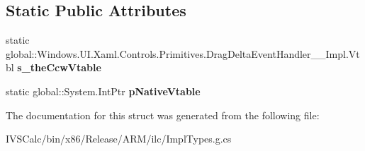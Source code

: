 \subsection*{Static Public Attributes}
\begin{DoxyCompactItemize}
\item 
\mbox{\label{struct_windows_1_1_u_i_1_1_xaml_1_1_controls_1_1_primitives_1_1_drag_delta_event_handler_____impl_1_1_vtbl_a746dc25e0e102b881f9ac84ad0234b81}} 
static global\+::\+Windows.\+U\+I.\+Xaml.\+Controls.\+Primitives.\+Drag\+Delta\+Event\+Handler\+\_\+\+\_\+\+Impl.\+Vtbl {\bfseries s\+\_\+the\+Ccw\+Vtable}
\item 
\mbox{\label{struct_windows_1_1_u_i_1_1_xaml_1_1_controls_1_1_primitives_1_1_drag_delta_event_handler_____impl_1_1_vtbl_a0e167021a4d3a2e1da07aeea4784d7ea}} 
static global\+::\+System.\+Int\+Ptr {\bfseries p\+Native\+Vtable}
\end{DoxyCompactItemize}


The documentation for this struct was generated from the following file\+:\begin{DoxyCompactItemize}
\item 
I\+V\+S\+Calc/bin/x86/\+Release/\+A\+R\+M/ilc/Impl\+Types.\+g.\+cs\end{DoxyCompactItemize}
